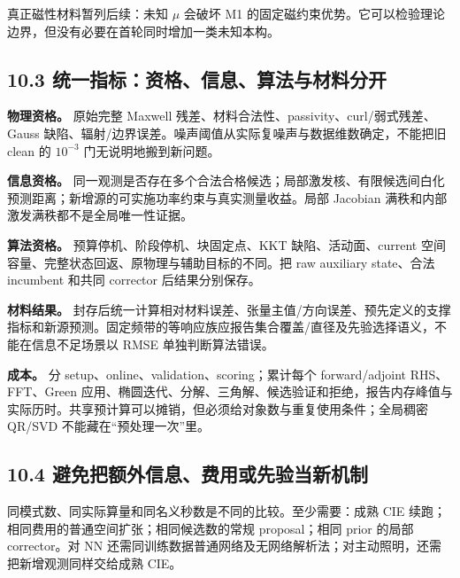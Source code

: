 \documentclass[11pt,a4paper]{article}
\begin{document}
真正磁性材料暂列后续：未知 \(\mu\) 会破坏 M1
的固定磁约束优势。它可以检验理论边界，但没有必要在首轮同时增加一类未知本构。

\hypertarget{ux7edfux4e00ux6307ux6807ux8d44ux683cux4fe1ux606fux7b97ux6cd5ux4e0eux6750ux6599ux5206ux5f00}{%
\subsection{10.3
统一指标：资格、信息、算法与材料分开}\label{ux7edfux4e00ux6307ux6807ux8d44ux683cux4fe1ux606fux7b97ux6cd5ux4e0eux6750ux6599ux5206ux5f00}}

\textbf{物理资格。} 原始完整 Maxwell
残差、材料合法性、passivity、curl/弱式残差、Gauss
缺陷、辐射/边界误差。噪声阈值从实际复噪声与数据维数确定，不能把旧 clean
的 \(10^{-3}\) 门无说明地搬到新问题。

\textbf{信息资格。}
同一观测是否存在多个合法合格候选；局部激发核、有限候选间白化预测距离；新增源的可实施功率约束与真实测量收益。局部
Jacobian 满秩和内部激发满秩都不是全局唯一性证据。

\textbf{算法资格。} 预算停机、阶段停机、块固定点、KKT
缺陷、活动面、current 空间容量、完整状态回返、原物理与辅助目标的不同。把
raw auxiliary state、合法 incumbent 和共同 corrector 后结果分别保存。

\textbf{材料结果。}
封存后统一计算相对材料误差、张量主值/方向误差、预先定义的支撑指标和新源预测。固定频带的等响应族应报告集合覆盖/直径及先验选择语义，不能在信息不足场景以
RMSE 单独判断算法错误。

\textbf{成本。} 分 setup、online、validation、scoring；累计每个
forward/adjoint RHS、FFT、Green
应用、椭圆迭代、分解、三角解、候选验证和拒绝，报告内存峰值与实际历时。共享预计算可以摊销，但必须给对象数与重复使用条件；全局稠密
QR/SVD 不能藏在``预处理一次''里。

\hypertarget{ux907fux514dux628aux989dux5916ux4fe1ux606fux8d39ux7528ux6216ux5148ux9a8cux5f53ux65b0ux673aux5236}{%
\subsection{10.4
避免把额外信息、费用或先验当新机制}\label{ux907fux514dux628aux989dux5916ux4fe1ux606fux8d39ux7528ux6216ux5148ux9a8cux5f53ux65b0ux673aux5236}}

同模式数、同实际算量和同名义秒数是不同的比较。至少需要：成熟 CIE
续跑；相同费用的普通空间扩张；相同候选数的常规 proposal；相同 prior
的局部 corrector。对 NN
还需同训练数据普通网络及无网络解析法；对主动照明，还需把新增观测同样交给成熟
CIE。
\end{document}
